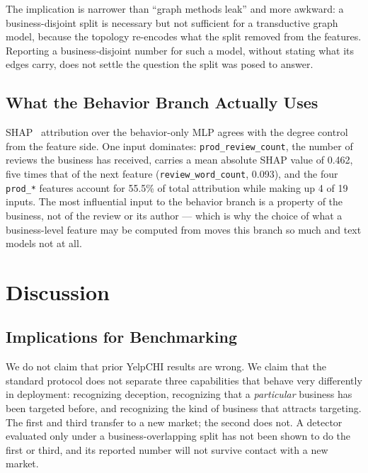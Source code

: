 \documentclass[conference]{IEEEtran}
\begin{document}
The implication is narrower than ``graph methods leak'' and more awkward: a
business-disjoint split is necessary but not sufficient for a transductive graph
model, because the topology re-encodes what the split removed from the features.
Reporting a business-disjoint number for such a model, without stating what its
edges carry, does not settle the question the split was posed to answer.

\subsection{What the Behavior Branch Actually Uses}

SHAP~\cite{lundberg2017unified} attribution over the behavior-only MLP agrees
with the degree control from the feature side. One input dominates:
\texttt{prod\_review\_count}, the number of reviews the business has received,
carries a mean absolute SHAP value of 0.462, five times that of the next feature
(\texttt{review\_word\_count}, 0.093), and the four \texttt{prod\_*} features
account for 55.5\% of total attribution while making up 4 of 19 inputs. The most
influential input to the behavior branch is a property of the business, not of
the review or its author --- which is why the choice of what a business-level
feature may be computed from moves this branch so much and text models not at
all.

\section{Discussion}
\label{sec:discussion}

\subsection{Implications for Benchmarking}

We do not claim that prior YelpCHI results are wrong. We claim that the standard
protocol does not separate three capabilities that behave very differently in
deployment: recognizing deception, recognizing that a \textit{particular}
business has been targeted before, and recognizing the kind of business that
attracts targeting. The first and third transfer to a new market; the second
does not. A detector evaluated only under a business-overlapping split has not
been shown to do the first or third, and its reported number will not survive
contact with a new market.
\end{document}
